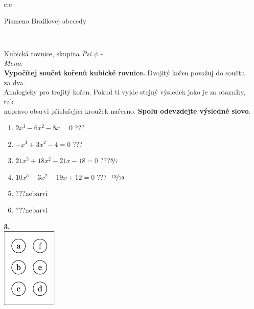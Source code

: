 \documentclass[10pt]{report}
\begin{document}
\begin{tabular}{c:c}
\begin{minipage}[c][99mm][t]{0.49\linewidth}
\begin{center}
\begin{minipage}{0.20\linewidth}
\begin{center}
{\small Písmeno Braillovej abecedy}
\end{center}
\end{minipage}
\end{center}
\end{minipage}
\\ \hdashline
\begin{minipage}[c][99mm][t]{0.49\linewidth}
\begin{center}
\vspace{7mm}
{\huge Kubická rovnice, skupina \textit{Psi $\psi$} -}\\[4.5mm]
\textit{Meno:}\phantom{xxxxxxxxxxxxxxxxxxxxxxxxxxxxxxxxxxxxxxxxxxxxxxxxxxxxxxxxxxxxxxxxx}\\[3.5mm]
\textbf{Vypočítej součet kořenů kubické rovnice.} Dvojitý kořen považuj do součtu za dva.\\Analogicky pro trojitý kořen. Pokud ti vyjde stejný výsledek jako je za otazníky, tak\\napravo obarvi příslušející kroužek načerno. \textbf{Spolu odevzdejte výsledné slovo}.\\[3mm]
\begin{minipage}{0.77\linewidth}
\begin{center}
\begin{varwidth}{\textwidth}
\begin{enumerate}
\large
\item $2x^3-6x^2-8x=0$\quad \dotfill\; ???\;\dotfill {}
\item $-x^3+3x^2-4=0$\quad \dotfill\; ???\;\dotfill {}
\item $21x^3+18x^2-21x-18=0$\quad \dotfill\; ???\;\dotfill \quad $\nicefrac{8}{7}$
\item $10x^3-3x^2-19x+12=0$\quad \dotfill\; ???\;\dotfill \quad $\nicefrac{-13}{10}$
\item \quad \dotfill\; ???\;\dotfill \quad nebarvi
\item \quad \dotfill\; ???\;\dotfill \quad nebarvi
\end{enumerate}
\end{varwidth}
\end{center}
\end{minipage}
\begin{minipage}{0.20\linewidth}
\begin{center}
{\Huge\bfseries 3.} \\[2mm]
\includegraphics[height=40mm]{../images/braille.png}

\end{center}
\end{minipage}
\end{center}
\end{minipage}
\end{tabular}
\end{document}
